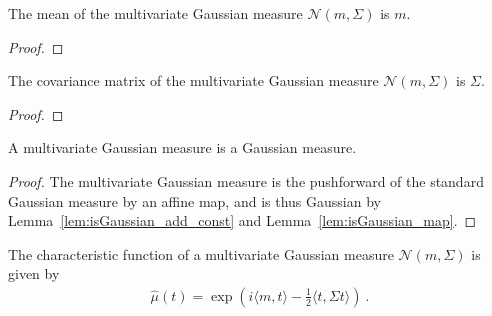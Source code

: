 \begin{lemma}\label{lem:integral_id_multivariateGaussian}
  \leanok
The mean of the multivariate Gaussian measure $\mathcal{N}(m, \Sigma)$ is $m$.
\end{lemma}

\begin{proof}\leanok

\end{proof}


\begin{lemma}\label{lem:covMatrix_multivariateGaussian}
  \leanok
The covariance matrix of the multivariate Gaussian measure $\mathcal{N}(m, \Sigma)$ is $\Sigma$.
\end{lemma}

\begin{proof}\leanok

\end{proof}


\begin{lemma}\label{lem:isGaussian_multivariateGaussian}
  \leanok
A multivariate Gaussian measure is a Gaussian measure.
\end{lemma}

\begin{proof}\leanok
The multivariate Gaussian measure is the pushforward of the standard Gaussian measure by an affine map, and is thus Gaussian by Lemma~\ref{lem:isGaussian_add_const} and Lemma~\ref{lem:isGaussian_map}.
\end{proof}


\begin{theorem}\label{thm:charFun_multivariateGaussian}
  \leanok
The characteristic function of a multivariate Gaussian measure $\mathcal{N}(m, \Sigma)$ is given by
\begin{align*}
  \hat{\mu}(t) = \exp\left(i \langle m, t \rangle - \frac{1}{2} \langle t, \Sigma t \rangle\right)
  \: .
\end{align*}
\end{theorem}

